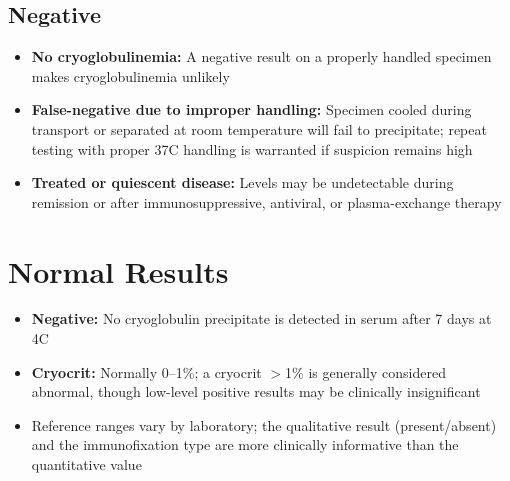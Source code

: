 \subsection*{Negative}
\begin{itemize}
  \item \textbf{No cryoglobulinemia:} A negative result on a properly handled specimen makes cryoglobulinemia unlikely
  \item \textbf{False-negative due to improper handling:} Specimen cooled during transport or separated at room temperature will fail to precipitate; repeat testing with proper 37\textdegree{}C handling is warranted if suspicion remains high
  \item \textbf{Treated or quiescent disease:} Levels may be undetectable during remission or after immunosuppressive, antiviral, or plasma-exchange therapy
\end{itemize}

\section*{Normal Results}
\begin{itemize}
  \item \textbf{Negative:} No cryoglobulin precipitate is detected in serum after 7 days at 4\textdegree{}C
  \item \textbf{Cryocrit:} Normally 0--1\%; a cryocrit $>$1\% is generally considered abnormal, though low-level positive results may be clinically insignificant
  \item Reference ranges vary by laboratory; the qualitative result (present/absent) and the immunofixation type are more clinically informative than the quantitative value
\end{itemize}

